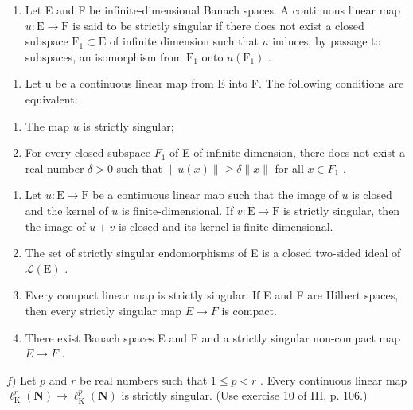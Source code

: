 \begin{enumerate}
\def\labelenumi{\arabic{enumi})}
\setcounter{enumi}{4}
\tightlist
\item
  Let E and F be infinite-dimensional Banach spaces. A continuous linear map \(u: \mathrm{E} \to \mathrm{F}\) is said to be strictly singular if there does not exist a closed subspace \(\mathrm{F}_1 \subset \mathrm{E}\) of infinite dimension such that \(u\) induces, by passage to subspaces, an isomorphism from \(\mathrm{F}_1\) onto \(u(\mathrm{F}_1)\) .
\end{enumerate}

\begin{enumerate}
\def\labelenumi{\alph{enumi})}
\tightlist
\item
  Let u be a continuous linear map from E into F. The following conditions are equivalent:
\end{enumerate}

\begin{enumerate}
\def\labelenumi{(\roman{enumi})}
\item
  The map \(u\) is strictly singular;
\item
  For every closed subspace \(F_{1}\) of E of infinite dimension, there does not exist a real number \(\delta > 0\) such that \(\|u(x)\| \geqslant \delta\|x\|\) for all \(x \in F_{1}\) .
\end{enumerate}

\begin{enumerate}
\def\labelenumi{\alph{enumi})}
\setcounter{enumi}{1}
\item
  Let \(u \colon \mathrm{E} \to \mathrm{F}\) be a continuous linear map such that the image of \(u\) is closed and the kernel of \(u\) is finite-dimensional. If \(v \colon \mathrm{E} \to \mathrm{F}\) is strictly singular, then the image of \(u + v\) is closed and its kernel is finite-dimensional.
\item
  The set of strictly singular endomorphisms of E is a closed two-sided ideal of \(\mathcal{L}(\mathrm{E})\) .
\item
  Every compact linear map is strictly singular. If E and F are Hilbert spaces, then every strictly singular map \(E \rightarrow F\) is compact.
\item
  There exist Banach spaces E and F and a strictly singular non-compact map \(E \rightarrow F\) .
\end{enumerate}

\(f)\) Let \(p\) and \(r\) be real numbers such that \(1 \leqslant p < r\) . Every continuous linear map \(\ell_{\mathrm{K}}^{r}(\mathbf{N}) \to \ell_{\mathrm{K}}^{p}(\mathbf{N})\) is strictly singular. (Use exercise 10 of III, p. 106.)

